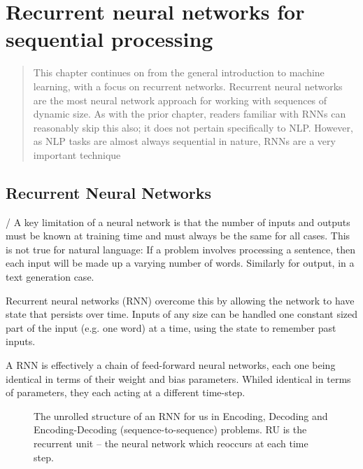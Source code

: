 \documentclass[12pt,parskip]{komatufte}
\begin{document}
	
\chapter{Recurrent neural networks for sequential processing}\label{sec:rnn}
\begin{abstract}
	This chapter continues on from the general introduction to machine learning, with a focus on recurrent networks.
	Recurrent neural networks are the most neural network approach for  working with sequences of dynamic size.
	As with the prior chapter, readers familiar with RNNs can reasonably skip this also;
	it does not pertain specifically to NLP.
	However, as NLP tasks are almost always sequential in nature, RNNs are a very important technique
\end{abstract}

\section{Recurrent Neural Networks}
/
A key limitation of a neural network is that the number of inputs and outputs must be known at training time and must always be the same for all cases.
This is not true for natural language: If a problem involves processing a sentence, then each input will be made up a varying number of words. Similarly for output, in a text generation case.

Recurrent neural networks (RNN) overcome this by allowing the network to have state that persists over time.
Inputs of any size can be handled one constant sized part of the input (e.g. one word) at a time, using the state to remember past inputs.


A RNN is effectively a chain of feed-forward neural networks,
each one being identical in terms of their weight and bias parameters.
Whiled identical in terms of parameters, they each acting at a different time-step.


\begin{figure}
	\caption{The unrolled structure of an RNN for us in Encoding, Decoding and Encoding-Decoding (sequence-to-sequence) problems. RU is the recurrent unit -- the neural network which reoccurs at each time step.}
	
	\label{fig-rnns}
	
	\resizebox{\textwidth}{!}{}
\end{figure}
\end{document}
